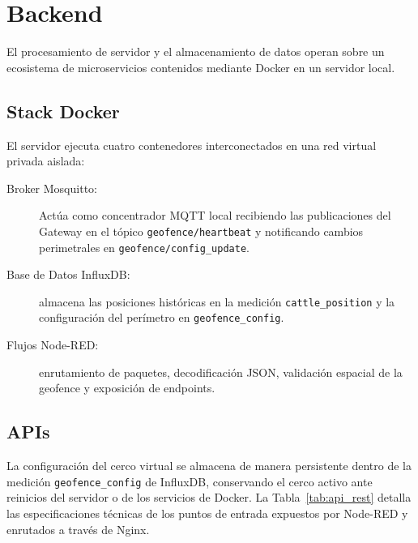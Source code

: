 \section{Backend}

El procesamiento de servidor y el almacenamiento de datos operan sobre un ecosistema de microservicios contenidos mediante Docker en un servidor local. 

\subsection{Stack Docker}

El servidor ejecuta cuatro contenedores interconectados en una red virtual privada aislada:
\begin{description}
    \item[Broker Mosquitto:] Actúa como concentrador MQTT local recibiendo las publicaciones del Gateway en el tópico \texttt{geofence/heartbeat} y notificando cambios perimetrales en \texttt{geofence/config\_update}.
    \item[Base de Datos InfluxDB:] almacena las posiciones históricas en la medición \texttt{cattle\_position} y la configuración del perímetro en \texttt{geofence\_config}.
    \item[Flujos Node-RED:] enrutamiento de paquetes, decodificación JSON, validación espacial de la geofence y exposición de endpoints.
\end{description}


\subsection{APIs}

La configuración del cerco virtual se almacena de manera persistente dentro de la medición \texttt{geofence\-\_config} de InfluxDB, conservando el cerco activo ante reinicios del servidor o de los servicios de Docker. La Tabla~\ref{tab:api_rest} detalla las especificaciones técnicas de los puntos de entrada expuestos por Node-RED y enrutados a través de Nginx.

